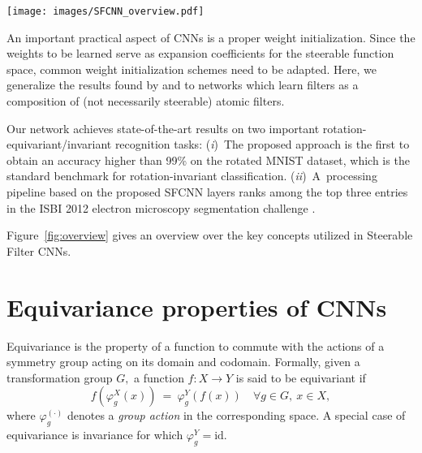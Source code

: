 \documentclass[10pt,twocolumn,letterpaper]{article}
\newcommand{\id}{\mathrm{id}}
\begin{document}
\begin{figure*}[t]
	\centering
	\texttt{[image: images/SFCNN\_overview.pdf]}
	\caption{
		Key concepts of the proposed Steerable Filter CNN:
		The filters are parameterized in a steerable function space with shared weights over filter orientations.
		Exact filter rotations are achieved by a phase manipulation of the expansion coefficients $w_q.$
		All layers are designed to be jointly translation and rotation equivariant.
		The weights $w_q$ serve as expansion coefficients of a fixed filter basis $\{\psi_q\}_{q}$ rather than pixel values.
		Therefore, we adapt He's weight initialization scheme to this more general case which implies to normalize the basis filter energies.
	}
	\vspace*{-2.5ex}
	\label{fig:overview}
\end{figure*}

An important practical aspect of CNNs is a proper weight initialization.
Since the weights to be learned serve as expansion coefficients for the steerable function space, common weight initialization schemes need to be adapted.
Here, we generalize the results found by \citet{Glorot10understandingthe} and \citet{DBLP:journals/corr/HeZR015} to networks which learn filters as a composition of (not necessarily steerable) atomic filters.

Our network achieves state-of-the-art results on two important rotation-equivariant/invariant recognition tasks: 
(\emph{i})~The proposed approach is the first to obtain an accuracy higher than 99\% on the rotated MNIST dataset, which is the standard benchmark for rotation-invariant classification.
(\emph{ii})~A~processing pipeline based on the proposed \mbox{SFCNN} layers ranks among the top three entries in the ISBI 2012 electron microscopy segmentation challenge \cite{arganda2015crowdsourcing}.

Figure~\ref{fig:overview} gives an overview over the key concepts utilized in Steerable Filter \mbox{CNNs}.



\section{Equivariance properties of CNNs}

Equivariance is the property of a function to commute with the actions of a symmetry group acting on its domain and codomain.
Formally, given a transformation group $G,$ a function $f:X\to Y$ is said to be equivariant if
\begin{equation*}
	f\left(\varphi_g^X (x)\right)\ =\ \varphi_g^Y \left(f\left(x\right)\right) \quad \forall g\in G,\ x\in X,
\end{equation*}
where $\varphi_g^{(\cdot)}$ denotes a \emph{group action} in the corresponding space.
A special case of equivariance is invariance for which $\varphi_g^Y=\id$.
\end{document}
